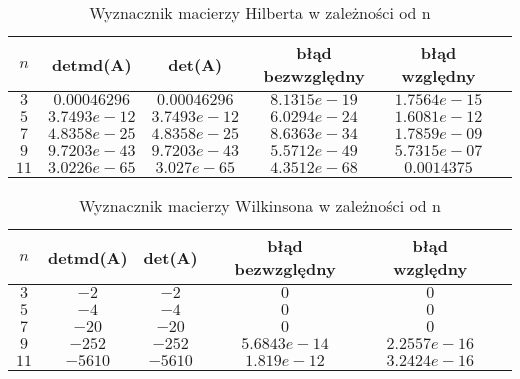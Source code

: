 \documentclass[12pt]{article}
\begin{document}
\begin{table}[h!]
\caption{\footnotesize Wyznacznik macierzy Hilberta w zale\.zno\'sci od n}%
\renewcommand{\arraystretch}{1.1}
\centering\begin{tabular}{|c|c|c|c|c|c|}
\hline $n$ & detmd(A) & det(A) & b\l{}\k{a}d bezwzgl\k{e}dny & b\l{}\k{a}d wzgl\k{e}dny\\
\hline $3$ & $0.00046296$ & $0.00046296$ & $8.1315e-19$ & $1.7564e-15$ \\
\hline $5$ & $3.7493e-12$ & $3.7493e-12$ & $6.0294e-24$ & $1.6081e-12$ \\
\hline $7$ & $4.8358e-25$ & $4.8358e-25$ & $8.6363e-34$ & $1.7859e-09$ \\
\hline $9$ & $9.7203e-43$ & $9.7203e-43$ & $5.5712e-49$ & $5.7315e-07$ \\
\hline $11$ & $3.0226e-65$ & $3.027e-65$ & $4.3512e-68$ & $0.0014375$ \\
\hline
\end{tabular}
\label{WyznacznikHilb}
\end{table}

\begin{table}[h!]
\caption{\footnotesize Wyznacznik macierzy Wilkinsona w zale\.zno\'sci od n}%
\renewcommand{\arraystretch}{1.1}
\centering\begin{tabular}{|c|c|c|c|c|c|}
\hline $n$ & detmd(A) & det(A) & b\l{}\k{a}d bezwzgl\k{e}dny & b\l{}\k{a}d wzgl\k{e}dny\\
\hline $3$ & $-2$ & $-2$ & $0$ & $0$ \\
\hline $5$ & $-4$ & $-4$ & $0$ & $0$ \\
\hline $7$ & $-20$ & $-20$ & $0$ & $0$ \\
\hline $9$ & $-252$ & $-252$ & $5.6843e-14$ & $2.2557e-16$ \\
\hline $11$ & $-5610$ & $-5610$ & $1.819e-12$ & $3.2424e-16$ \\
\hline
\end{tabular}
\label{WyznacznikWilk}
\end{table}
\end{document}
